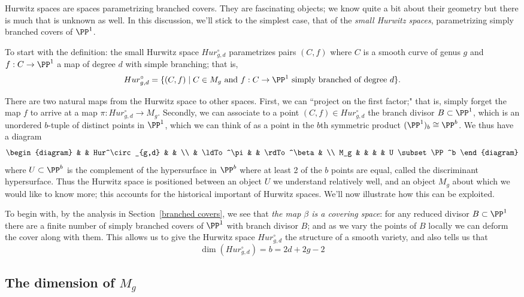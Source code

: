 Hurwitz spaces are spaces parametrizing branched covers. They are fascinating objects; we know quite a bit about their geometry but there is much that is unknown as well. In this discussion, we'll stick to the simplest case, that of the \emph{small Hurwitz spaces}, parametrizing simply branched covers of $\PP^1$.

To start with the definition: the small Hurwitz space $Hur^\circ_{g,d}$ parametrizes pairs $(C, f)$ where $C$ is a smooth curve of genus $g$ and $f : C \to \PP^1$ a map of degree $d$ with simple branching; that is,
$$
Hur^\circ_{g,d} = \{ (C, f) \mid C \in M_g  \text{ and } f:C \to \PP^1 \text{ simply branched of degree } d\}.
$$

There are two natural maps from the Hurwitz space to other spaces. First, we can ``project on the first factor;" that is, simply forget the map $f$ to arrive at a map $\pi : Hur^\circ_{g,d} \to M_g$. Secondly, we can associate to a point $(C,f) \in Hur^\circ_{g,d}$ the branch divisor $B \subset \PP^1$, which is an unordered $b$-tuple of distinct points in $\PP^1$, which we can think of as a point in the $b$th symmetric product $(\PP^1)_b  \cong \PP^b$. We thus have a diagram
$$
\begin{diagram}
& & Hur^\circ_{g,d} & & \\
& \ldTo^\pi & & \rdTo^\beta & \\
M_g & & & & U \subset \PP^b
\end{diagram}
$$
where $U \subset \PP^b$ is the complement of the hypersurface in $\PP^{b}$ where at least 2 of the
$b$ points are equal, called the discriminant hypersurface. Thus the Hurwitz space is positioned between an object $U$ we understand relatively well, and an object $M_g$ about which we would like to know more; this accounts for the historical important of Hurwitz spaces. We'll now illustrate how this can be exploited.

To begin with, by the analysis in Section~\ref{branched covers}, we see that \emph{the map $\beta$ is a covering space}: for any reduced divisor $B \subset \PP^1$ there are a finite number of simply branched covers of $\PP^1$ with branch divisor $B$; and as we vary the points of $B$ locally we can deform the cover along with them. This allows us to give the Hurwitz space $Hur^\circ_{g,d}$ the structure of a smooth variety, and also tells us that
$$
\dim(Hur^\circ_{g,d}) = b = 2d+2g-2
$$

\subsection{The dimension of $M_g$} 

